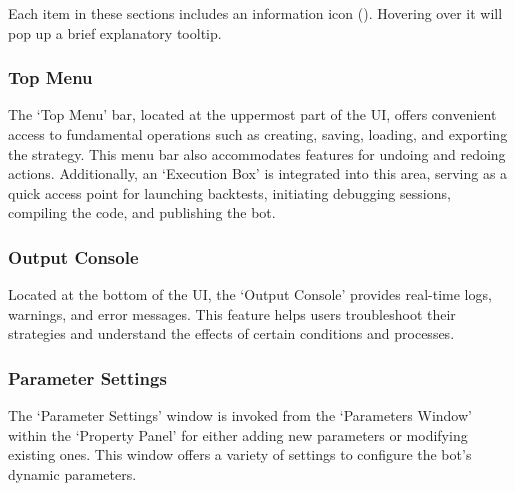 Each item in these sections includes an information icon (). Hovering over it will pop up a brief explanatory tooltip.


\subsubsection{Top Menu}

The `Top Menu' bar, located at the uppermost part of the UI, offers convenient access to fundamental operations such as creating, saving, loading, and exporting the strategy. This menu bar also accommodates features for undoing and redoing actions. Additionally, an `Execution Box' is integrated into this area, serving as a quick access point for launching backtests, initiating debugging sessions, compiling the code, and publishing the bot.

\subsubsection{Output Console}

Located at the bottom of the UI, the `Output Console' provides real-time logs, warnings, and error messages. This feature helps users troubleshoot their strategies and understand the effects of certain conditions and processes.

\subsubsection{Parameter Settings}
\label{sec:parameters}

The `Parameter Settings' window is invoked from the `Parameters Window' within the `Property Panel' for either adding new parameters or modifying existing ones. This window offers a variety of settings to configure the bot's dynamic parameters.

